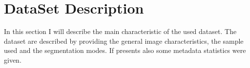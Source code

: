 \documentclass{standalone}
\begin{document}
	\section{DataSet Description}
	
	In this section I will describe the main characteristic of the used dataset. The dataset are described by providing the general image characteristics, the sample used and the segmentation modes. If presents also some metadata statistics were given.
\end{document}
